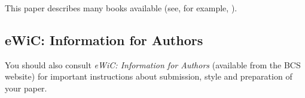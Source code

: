 
This paper describes  many books
available (see, for example, \cite{Companion,KopkaDaly,Lamport}).

\subsection{eWiC: Information for Authors}
You should also consult \emph{eWiC: Information for Authors} (available
from the BCS website) for important instructions about submission,
style and preparation of your paper.